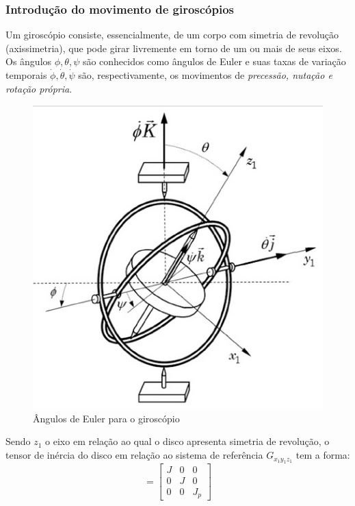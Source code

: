 \documentclass[a4paper, 12pt]{article}
\begin{document}
		\subsubsection{Introdução do movimento de giroscópios}
		Um giroscópio consiste, essencialmente, de um corpo com simetria de revolução (axissimetria), que pode girar livremente em torno de um ou mais de seus eixos.\\
		
		Os ângulos $\phi , \theta , \psi$ são conhecidos como ângulos de Euler e suas taxas de variação temporais  $\dot{\phi} , \dot{\theta} , \dot{\psi}$ são, respectivamente, os movimentos de \textit{precessão, nutação e rotação própria}.
		\begin{figure}[h]
			\center
			\includegraphics[scale=0.5]{imagens/a9.png} 
			\caption{Ângulos de Euler para o giroscópio}
		\end{figure}
		
		Sendo $z_1$ o eixo em relação ao qual o disco apresenta simetria de revolução, o tensor de inércia do disco em relação ao sistema de referência $G_{x_1y_1z_1}$ tem a forma:
		\begin{equation}
			[J_{G_{x_1y_1z_1}}] = \begin{bmatrix}
			J & 0 & 0\\
			0 & J & 0\\
			0 & 0 & J_p
			\end{bmatrix}
		\end{equation}
\end{document}
